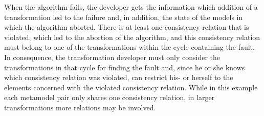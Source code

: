 When the algorithm fails, the developer gets the information which addition of a transformation led to the failure and, in addition, the state of the models in which the algorithm aborted.
There is at least one consistency relation that is violated, which led to the abortion of the algorithm, and this consistency relation must belong to one of the transformations within the cycle containing the fault.
In consequence, the transformation developer must only consider the transformations in that cycle for finding the fault and, since he or she knows which consistency relation was violated, can restrict his- or herself to the elements concerned with the violated consistency relation.
While in this example each metamodel pair only shares one consistency relation, in larger transformations more relations may be involved.

